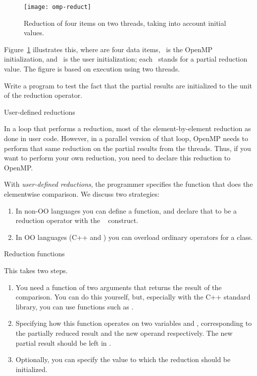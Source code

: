 \begin{figure}[ht]
  \texttt{[image: omp-reduct]}
  \caption{Reduction of four items on two threads, taking into account
    initial values.}
  \label{fig:omp-reduct}  
\end{figure}
%
Figure~\ref{fig:omp-reduct} illustrates this, where  are
four data items, ~is the OpenMP initialization, and ~is the
user initialization; each ~stands for a partial reduction value.
The figure is based on execution using two threads.

\begin{exercise}
  Write a program to test the fact that the partial results
  are initialized to the unit of the reduction operator.
\end{exercise}

 {User-defined reductions}

In a loop that performs a reduction,
most of the element-by-element reduction as done in user code.
However, in a parallel version of that loop,
OpenMP needs to perform that same reduction on the partial results
from the threads.
Thus, if you want to perform your own reduction,
you need to declare this reduction to OpenMP.

With \emph{user-defined reductions}, the programmer specifies the
function that does the elementwise comparison.
We discuss two strategies:
\begin{enumerate}
\item In non-\ac{OO} languages you can define a function,
  and declare that to be a reduction operator with the
  ~ construct.
\item In \ac{OO} languages (C++ and )
  you can overload ordinary operators for a class.
\end{enumerate}

 {Reduction functions}

This takes two steps.
\begin{enumerate}
\item You need a function of two arguments that returns the result of
  the comparison. You can do this yourself, but, especially with the
  C++ standard library, you can use functions such as .
\item Specifying how this function operates on two variables
   and , corresponding to the
  partially reduced result and the new operand respectively. The new
  partial result should be left in .
\item Optionally, you can specify the value to which the reduction
  should be initialized.
\end{enumerate}


